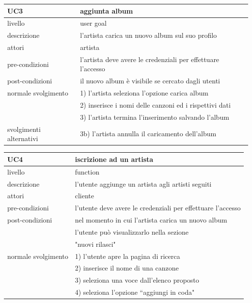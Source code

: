 \documentclass{article}
\begin{document}
  \begin{table}[H]
    \centering
    \begin{tabular}{|l|l|}
      \hline
      \textbf{UC3} & \textbf{aggiunta album}\\
      \hline
      livello & user goal\\
      \hline
      descrizione & l'artista carica un nuovo album sul suo profilo\\
      \hline
      attori & artista\\
      \hline
      pre-condizioni & l'artista deve avere le credenziali per effettuare l'accesso\\
      \hline
      post-condizioni & il nuovo album è visibile se cercato dagli utenti\\
      \hline
      normale svolgimento & 1) l'artista seleziona l'opzione carica album\\
      & 2) inserisce i nomi delle canzoni ed i rispettivi dati\\
      & 3) l'artista termina l'inserimento salvando l'album
      \\
      \hline
      svolgimenti alternativi & 3b) l'artista annulla il caricamento dell'album\\
      \hline

    \end{tabular}
    \label{tab:uct3}
  \end{table}

  \vspace{40pt}

  \begin{table}[H]
    \centering
    \begin{tabular}{|l|l|}
      \hline
      \textbf{UC4} & \textbf{iscrizione ad un artista}\\
      \hline
      livello                          & function                                                    \\
      \hline
      descrizione & l'utente aggiunge un artista agli artisti seguiti\\
      \hline
      attori & cliente\\
      \hline
      pre-condizioni & l'utente deve avere le credenziali per effettuare l'accesso\\
      \hline
      post-condizioni & nel momento in cui l'artista carica un nuovo album\\
      & l'utente può visualizzarlo nella sezione\\
      & "nuovi rilasci"\\
      \hline
      normale svolgimento \hspace{5pt} & 1) l'utente apre la pagina di ricerca\\
      & 2) inserisce il nome di una canzone\\
      & 3) seleziona una voce dall'elenco proposto\\
      & 4) seleziona l'opzione ``aggiungi in coda"
      \\
      \hline
    \end{tabular}
    \label{tab:uct4}
  \end{table}
\end{document}
